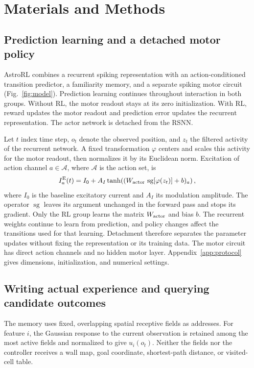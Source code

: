 \section{Materials and Methods}
\subsection{Prediction learning and a detached motor policy}
AstroRL combines a recurrent spiking representation with an action-conditioned transition predictor, a familiarity memory, and a separate spiking motor circuit (Fig.~\ref{fig:model}). Prediction learning continues throughout interaction in both groups. Without RL, the motor readout stays at its zero initialization. With RL, reward updates the motor readout and prediction error updates the recurrent representation. The actor network is detached from the RSNN.

Let $t$ index time step, $o_t$ denote the observed position, and $z_t$ the filtered activity of the recurrent network. A fixed transformation $\varphi$ centers and scales this activity for the motor readout, then normalizes it by its Euclidean norm. Excitation of action channel $a\in\mathcal A$, where $\mathcal A$ is the action set, is
\begin{equation}
 I^{\mathrm E}_a(t)=I_0+A_I\tanh\!\left((W_{\rm actor}\,\operatorname{sg}[\varphi(z_t)]+b)_a\right),
 \label{eq:actor}
\end{equation}
where $I_0$ is the baseline excitatory current and $A_I$ its modulation amplitude. The operator $\operatorname{sg}$ leaves its argument unchanged in the forward pass and stops its gradient. Only the RL group learns the matrix $W_{\rm actor}$ and bias $b$. The recurrent weights continue to learn from prediction, and policy changes affect the transitions used for that learning. Detachment therefore separates the parameter updates without fixing the representation or its training data. The motor circuit has direct action channels and no hidden motor layer. Appendix~\ref{app:protocol} gives dimensions, initialization, and numerical settings.



\subsection{Writing actual experience and querying candidate outcomes}
The memory uses fixed, overlapping spatial receptive fields as addresses. For feature $i$, the Gaussian response to the current observation is retained among the most active fields and normalized to give $u_i(o_t)$. Neither the fields nor the controller receives a wall map, goal coordinate, shortest-path distance, or visited-cell table.

